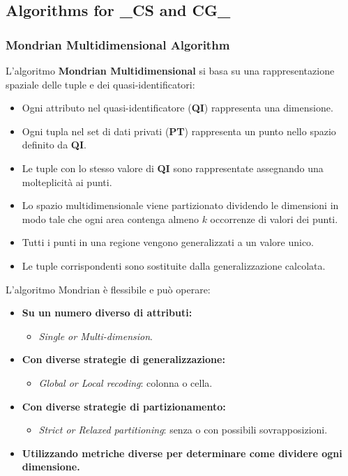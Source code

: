 \documentclass{report}
\begin{document}
\subsection{Algorithms for \textbf{\_CS} and \textbf{CG\_}}

\subsubsection{Mondrian Multidimensional Algorithm}
L'algoritmo \textbf{Mondrian Multidimensional} si basa su una rappresentazione spaziale delle tuple e dei quasi-identificatori:

\begin{itemize}
    \item Ogni attributo nel quasi-identificatore (\textbf{QI}) rappresenta una dimensione.
    \item Ogni tupla nel set di dati privati (\textbf{PT}) rappresenta un punto nello spazio definito da \textbf{QI}.
    \item Le tuple con lo stesso valore di \textbf{QI} sono rappresentate assegnando una molteplicità ai punti.
    \item Lo spazio multidimensionale viene partizionato dividendo le dimensioni in modo tale che ogni area contenga almeno $k$ occorrenze di valori dei punti. 
    \item Tutti i punti in una regione vengono generalizzati a un valore unico.
    \item Le tuple corrispondenti sono sostituite dalla generalizzazione calcolata.
\end{itemize}

\newpage \noindent L'algoritmo Mondrian è flessibile e può operare:
\begin{itemize}
    \item \textbf{Su un numero diverso di attributi:} 
    \begin{itemize}
        \item \textit{Single or Multi-dimension}.
    \end{itemize}
    \item \textbf{Con diverse strategie di generalizzazione:}
    \begin{itemize}
        \item \textit{Global or Local recoding}: colonna o cella.
    \end{itemize}
    \item \textbf{Con diverse strategie di partizionamento:} 
    \begin{itemize}
        \item \textit{Strict or Relaxed partitioning}: senza o con possibili sovrapposizioni.
    \end{itemize}
    \item \textbf{Utilizzando metriche diverse per determinare come dividere ogni dimensione.}
\end{itemize}
\end{document}
